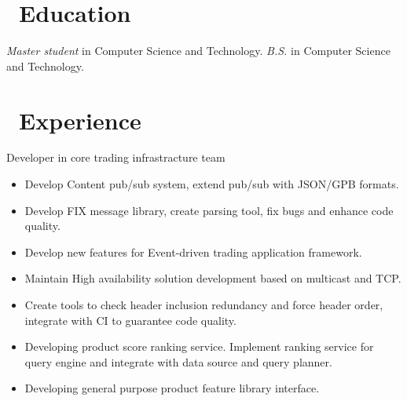 \documentclass{resume}
\begin{document}



\section{\faGraduationCap\ Education}
\textit{Master student} in Computer Science and Technology.
\textit{B.S.} in Computer Science and Technology.

\section{\faUsers\ Experience}
Developer in core trading infrastracture team
\begin{itemize}
  \item Develop Content pub/sub system, extend pub/sub with JSON/GPB formats.
  \item Develop FIX message library, create parsing tool, fix bugs and enhance code quality.
  \item Develop new features for Event-driven trading application framework.
  \item Maintain High availability solution development based on multicast and TCP.
  \item Create tools to check header inclusion redundancy and force header order, integrate with CI to guarantee code quality.
\end{itemize}

\begin{itemize}
  \item Developing product score ranking service. Implement ranking service for query engine and integrate
with data source and query planner.
  \item Developing general purpose product feature library interface.
\end{itemize}
\end{document}
